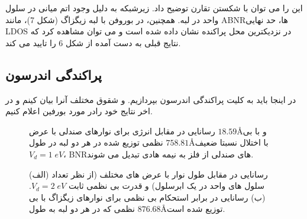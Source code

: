 این را می توان با شکستن تقارن توضیح داد. زیرشبکه به دلیل وجود اتم میانی در سلول واحد در لبه. همچنین، در بوروفن با لبه زیگزاگ (شکل 7)، مانند ABNRها، حد نهایی LDOS در نزدیکترین محل پراکنده نشان داده شده است و می توان مشاهده کرد که نتایج قبلی به دست آمده از شکل 6 را تایید می کند.

\subsection{پراکندگی اندرسون}
 در اینجا باید به کلیت پراکندگی اندرسون بپردازیم. و شقوق مختلف آنرا بیان کینم و در اخر نتایج خود رادر مورد بورفین اعلام کنیم.

\begin{figure}[!ht]
    \centering
      
      \caption{رسانایی در مقابل انرژی برای نوارهای صندلی با عرض $18.59$\AA و با بی نظمی توزیع شده در هر دو لبه در طول $758.81$\AA با اختلال نسبتا ضعیف $V_d=1\;eV$، BNRهای صندلی از فلز به نیمه هادی تبدیل می شوند.}
      \label{armdisorder}
    \end{figure}
    
    \begin{figure}[!ht]
      \centering
      
      \caption{(الف) رسانایی در مقابل طول نوار با عرض های مختلف (از نظر تعداد سلول های واحد در یک ابرسلول) و قدرت بی نظمی ثابت $V_d=2\;eV$. (ب) رسانایی در برابر استحکام بی نظمی برای نوارهای زیگزاگ با بی نظمی که در هر دو لبه به طول $876.68$\AA توزیع شده است.}
      \label{zigzag-width-strangth}
    \end{figure}
    
